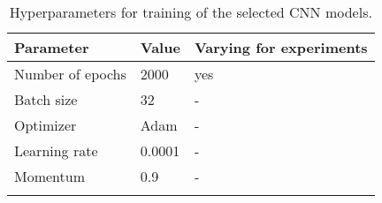 \begin{table}[ht!]
\begin{center}
\caption{Hyperparameters for training of the selected CNN models.}
\begin{tabular}{ M{6cm}  M{2cm} M{2cm}}
\toprule
\textbf{Parameter} & \textbf{Value} & \textbf{Varying for experiments} \\
\midrule
Number of epochs & 2000 & yes\\
Batch size & 32 & -\\
\midrule
Optimizer & Adam & -\\
Learning rate & 0.0001 & -\\
Momentum & 0.9 & -\\
\bottomrule
\label{tab:exp_details_params_train}
\end{tabular}
\end{center}
\vspace{-4mm}
\end{table}
\FloatBarrier
\noindent